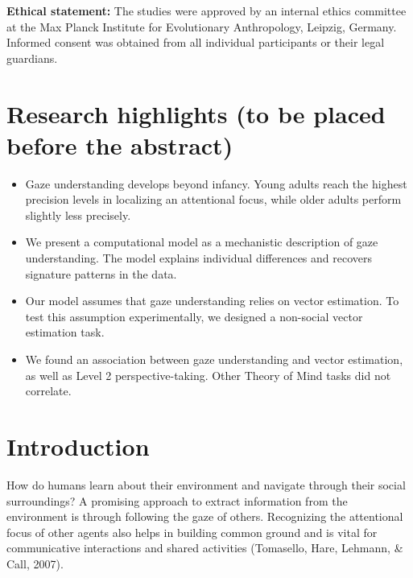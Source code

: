 \documentclass[
  man,mask,floatsintext]{apa6}
\providecommand{\tightlist}{%
  \setlength{\itemsep}{0pt}\setlength{\parskip}{0pt}}
\begin{document}
\textbf{Ethical statement:} The studies were approved by an internal ethics committee at the Max Planck Institute for Evolutionary Anthropology, Leipzig, Germany. Informed consent was obtained from all individual participants or their legal guardians.

\newpage

\hypertarget{research-highlights-to-be-placed-before-the-abstract}{%
\section{Research highlights (to be placed before the abstract)}\label{research-highlights-to-be-placed-before-the-abstract}}

\begin{itemize}
\tightlist
\item
  Gaze understanding develops beyond infancy. Young adults reach the highest precision levels in localizing an attentional focus, while older adults perform slightly less precisely.
\item
  We present a computational model as a mechanistic description of gaze understanding. The model explains individual differences and recovers signature patterns in the data.
\item
  Our model assumes that gaze understanding relies on vector estimation. To test this assumption experimentally, we designed a non-social vector estimation task.
\item
  We found an association between gaze understanding and vector estimation, as well as Level 2 perspective-taking. Other Theory of Mind tasks did not correlate.
\end{itemize}

\hypertarget{introduction}{%
\section{Introduction}\label{introduction}}

How do humans learn about their environment and navigate through their social surroundings? A promising approach to extract information from the environment is through following the gaze of others. Recognizing the attentional focus of other agents also helps in building common ground and is vital for communicative interactions and shared activities (Tomasello, Hare, Lehmann, \& Call, 2007).
\end{document}
